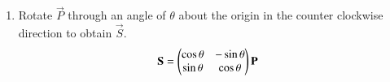 \documentclass[journal,12pt,twocolumn]{IEEEtran}
\renewcommand\thesection{\arabic{section}}
\begin{document}
\begin{enumerate}[label=\thesection.\arabic*
,ref=\thesection.\theenumi]
with the condition that $\vec{m},\vec{n}$ are orthonormal, i.e.
\begin{align}
\label{eq:reflect_ortho}
\vec{V}^T\vec{V}=  \vec{I}
\end{align}
%
Noting that 
\begin{align}
\label{eq:reflect_trans}
\myvec{\vec{m} & -\vec{n}} &= \myvec{\vec{m} & \vec{n}} \myvec{1 & 0 \\ 0 & -1},
\end{align}
\eqref{eq:reflect_bisectQR} can be expressed as
%
\begin{align}
\label{eq:reflect_}
\vec{V}^T\vec{R} &=  \sbrak{\vec{V}\myvec{1 & 0 \\ 0 & -1}}^T\vec{P}+\myvec{0 \\ 2c}
\\
\implies \vec{R} &= \sbrak{\vec{V}\myvec{1 & 0 \\ 0 & -1}\vec{V}^{-1}}^T\vec{P}+ \vec{V}\myvec{0 \\ 2c}
\\
 &=\vec{V}\myvec{1 & 0 \\ 0 & -1}\vec{V}^T \vec{P}+2c \vec{n}
\end{align}

\item Rotate $\vec{P}$ through an angle of  $ \theta $  about the origin in the counter clockwise 
direction to obtain $\vec{S}$.
\\
\solution 
\begin{align}
\label{eq:rotate}
\mathbf{S} &= \begin{pmatrix}\cos \theta & -\sin \theta \\ \sin \theta & \cos \theta\end{pmatrix} \mathbf{P}
\end{align}


\end{enumerate}
\end{document}
